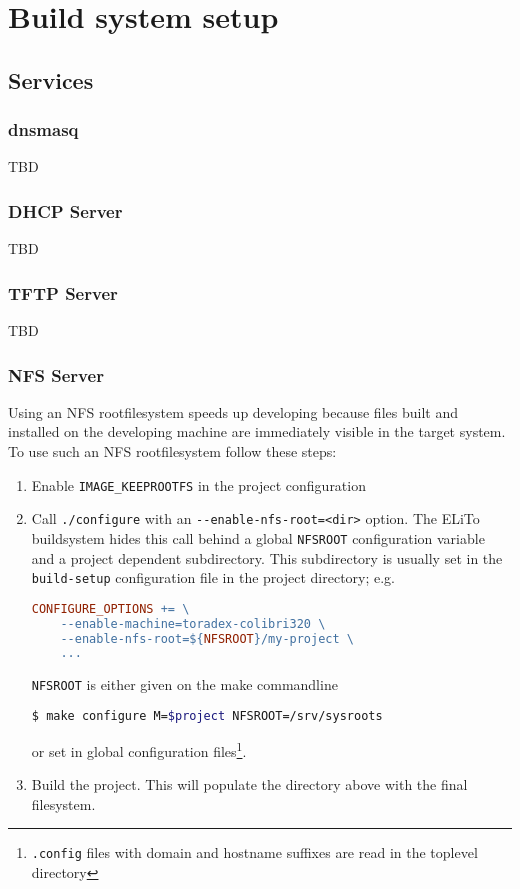 \chapter{Build system setup}
\label{chap:setup}

\section{Services}
\label{sec:setup_services}

\subsection{dnsmasq}
\label{sec:setup_services_dnsmasq}

TBD

\subsection{DHCP Server}
\label{sec:setup_services_dhcp-server}

TBD

\subsection{TFTP Server}
\label{sec:setup_services_tftp-server}

TBD

\subsection{NFS Server}
\label{sec:setup_services_nfs-server}

Using an NFS rootfilesystem speeds up developing because files built
and installed on the developing machine are immediately visible in the
target system.  To use such an NFS rootfilesystem follow these steps:

\begin{enumerate}
\item Enable \texttt{IMAGE\_KEEPROOTFS} in the project configuration
\item Call \texttt{./configure} with an
  \texttt{-\mbox{}-enable-nfs-root=<dir>} option. The ELiTo buildsystem hides
  this call behind a global \texttt{NFSROOT} configuration variable
  and a project dependent subdirectory.  This subdirectory is usually
  set in the \texttt{build-setup} configuration file in the project
  directory; e.g.
\begin{lstlisting}[language=make]
CONFIGURE_OPTIONS += \
	--enable-machine=toradex-colibri320 \
	--enable-nfs-root=${NFSROOT}/my-project \
	...
\end{lstlisting}%
  \texttt{NFSROOT} is either given on the make commandline
\begin{lstlisting}[language=bash]
$ make configure M=$project NFSROOT=/srv/sysroots
\end{lstlisting}
or set in global configuration files\footnote{\texttt{.config} files
  with domain and hostname suffixes are read in the toplevel
  directory}.
\item Build the project. This will populate the directory above with
  the final filesystem.
\end{enumerate}

